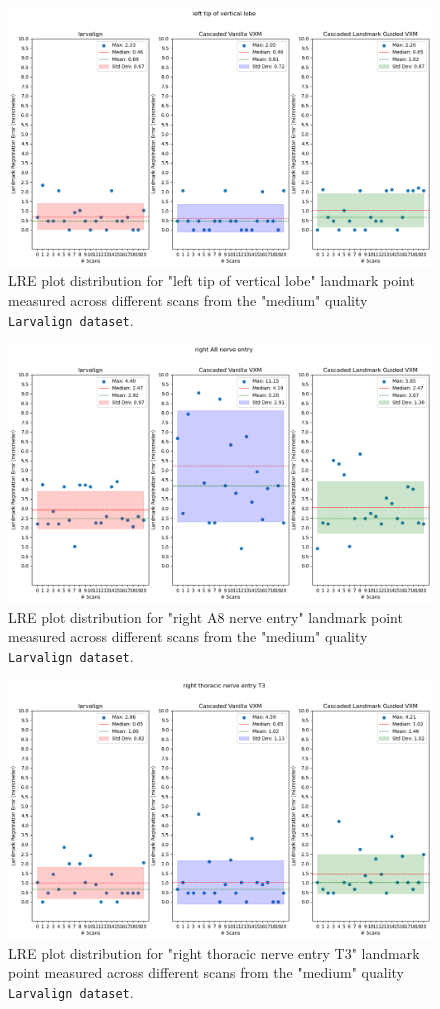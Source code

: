 	\begin{figure}[h]
		\centering
		\includegraphics[width=0.75\columnwidth]{resources/chapter5_fresh/output/left tip of vertical lobe.png}
		\caption{LRE plot distribution for "left tip of vertical lobe" landmark point measured across different scans from the "medium" quality \texttt{Larvalign dataset}.}
		\label{fig:landmark6}
	\end{figure}

	\begin{figure}[h]
		\centering
		\includegraphics[width=0.75\columnwidth]{resources/chapter5_fresh/output/right A8 nerve entry.png}
		\caption{LRE plot distribution for "right A8 nerve entry" landmark point measured across different scans from the "medium" quality \texttt{Larvalign dataset}.}
		\label{fig:landmark7}
	\end{figure}

	\begin{figure}[h]
		\centering
		\includegraphics[width=0.75\columnwidth]{resources/chapter5_fresh/output/right thoracic nerve entry T3.png}
		\caption{LRE plot distribution for "right thoracic nerve entry T3" landmark point measured across different scans from the "medium" quality \texttt{Larvalign dataset}.}
		\label{fig:landmark8}
	\end{figure}

